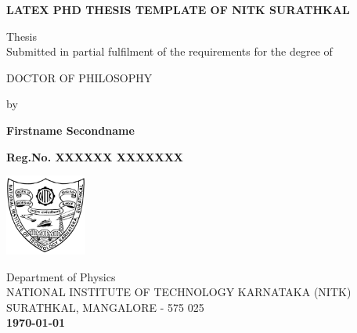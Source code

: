 \begin{titlepage}
    \begin{center}
        \vspace*{1cm}
        \bf 
        LATEX PHD THESIS TEMPLATE OF NITK SURATHKAL

        
        \vspace{0.5cm}
        
        
 \vspace{3cm}       
        
        Thesis\\
        \vspace{1cm}
        Submitted in partial fulfilment of the requirements for the degree of
        \vspace{1cm}

        DOCTOR OF PHILOSOPHY\\

        \vspace{1cm}

    by
    
    \vspace{.5cm}

        \textbf{Firstname Secondname}
        
        \vspace{1cm}
        
        \bf{Reg.No. XXXXXX XXXXXXX}
        
        \vspace{2cm}
   
    \includegraphics[width=0.2\textwidth]{logo}
  
      
        \vspace{2cm}

        
        
        Department of Physics\\
        NATIONAL INSTITUTE OF TECHNOLOGY KARNATAKA (NITK)\\
        SURATHKAL, MANGALORE - 575 025\\
        \bf{\today} 
        
    \end{center}
\end{titlepage}
